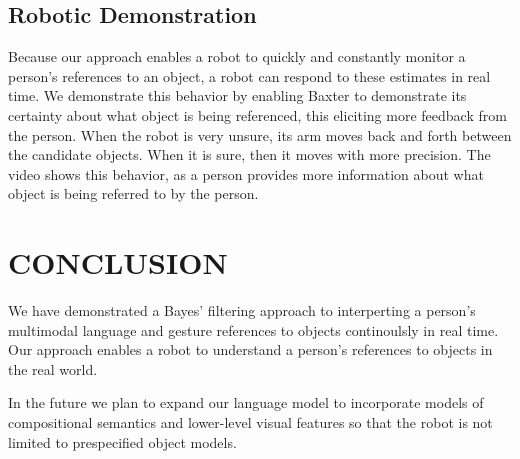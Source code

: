 \documentclass[letterpaper, 10 pt, conference]{ieeeconf}
\begin{document}
\subsection{Robotic Demonstration}

Because our approach enables a robot to quickly and constantly monitor
a person's references to an object, a robot can respond to these
estimates in real time.  We demonstrate this behavior by enabling
Baxter to demonstrate its certainty about what object is being
referenced, this eliciting more feedback from the person.  When the
robot is very unsure, its arm moves back and forth between the
candidate objects.  When it is sure, then it moves with more
precision.  The video shows this behavior, as a person provides more
information about what object is being referred to by the person.

\section{CONCLUSION}

We have demonstrated a Bayes' filtering approach to interperting a
person's multimodal language and gesture references to objects
continoulsly in real time.  Our approach enables a robot to understand
a person's references to objects in the real world.

In the future we plan to expand our language model to incorporate
models of compositional semantics and lower-level visual features so
that the robot is not limited to prespecified object models.




\end{document}
